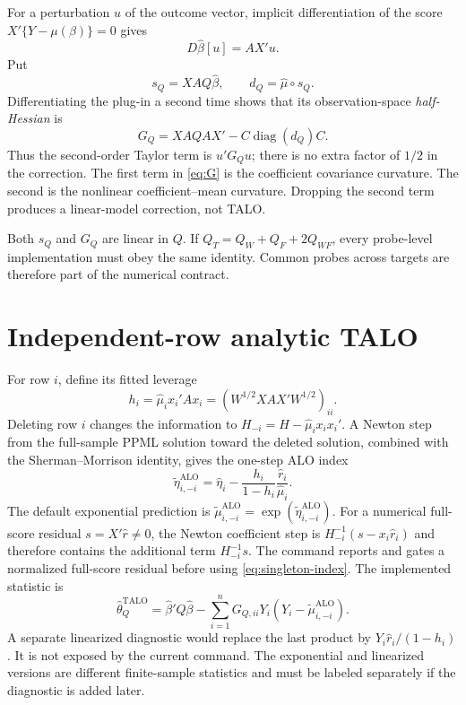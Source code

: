 \documentclass[11pt]{article}
\newcommand{\diag}{\operatorname{diag}}
\newcommand{\TALO}{\mathrm{TALO}}
\newcommand{\ALO}{\mathrm{ALO}}
\begin{document}
For a perturbation $u$ of the outcome vector, implicit differentiation of the
score $X'\{Y-\mu(\beta)\}=0$ gives
\[
 D\widehat\beta[u]=AX'u.
\]
Put
\[
 s_Q=XAQ\widehat\beta,
 \qquad d_Q=\widehat\mu\circ s_Q.
\]
Differentiating the plug-in a second time shows that its observation-space
\emph{half-Hessian} is
\begin{equation}
 G_Q=XAQAX'-C\diag(d_Q)C.                         \label{eq:G}
\end{equation}
Thus the second-order Taylor term is $u'G_Qu$; there is no extra factor of
$1/2$ in the correction.  The first term in \eqref{eq:G} is the coefficient
covariance curvature.  The second is the nonlinear coefficient--mean
curvature.  Dropping the second term produces a linear-model correction, not
TALO.

Both $s_Q$ and $G_Q$ are linear in $Q$.  If
$Q_T=Q_W+Q_F+2Q_{WF}$, every probe-level implementation must obey the same
identity.  Common probes across targets are therefore part of the numerical
contract.

\section{Independent-row analytic TALO}

For row $i$, define its fitted leverage
\[
 h_i=\widehat\mu_i x_i'Ax_i=(W^{1/2}XAX'W^{1/2})_{ii}.
\]
Deleting row $i$ changes the information to
$H_{-i}=H-\widehat\mu_i x_ix_i'$.  A Newton step from the full-sample PPML
solution toward the deleted solution, combined with the Sherman--Morrison
identity, gives the one-step ALO index
\begin{equation}
 \widetilde\eta_{i,-i}^{\ALO}
 =\widehat\eta_i-
 \frac{h_i}{1-h_i}\frac{\widehat r_i}{\widehat\mu_i}.       \label{eq:singleton-index}
\end{equation}
The default exponential prediction is
$\widetilde\mu_{i,-i}^{\ALO}=\exp(\widetilde\eta_{i,-i}^{\ALO})$.
For a numerical full-score residual $s=X'\widehat r\ne0$, the Newton
coefficient step is $H_{-i}^{-1}(s-x_i\widehat r_i)$ and therefore contains
the additional term $H_{-i}^{-1}s$.  The command reports and gates a
normalized full-score residual before using \eqref{eq:singleton-index}.
The implemented statistic is
\begin{equation}
 \widehat\theta_Q^{\TALO}
 =\widehat\beta'Q\widehat\beta-
 \sum_{i=1}^n G_{Q,ii}Y_i
       (Y_i-\widetilde\mu_{i,-i}^{\ALO}).                   \label{eq:talo}
\end{equation}
A separate linearized diagnostic would replace the last product by
$Y_i\widehat r_i/(1-h_i)$.  It is not exposed by the current command.  The
exponential and linearized versions are different finite-sample statistics and
must be labeled separately if the diagnostic is added later.
\end{document}

